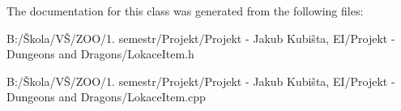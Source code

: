 The documentation for this class was generated from the following files\-:\begin{DoxyCompactItemize}
\item 
B\-:/Škola/\-VŠ/\-Z\-O\-O/1. semestr/\-Projekt/\-Projekt -\/ Jakub Kubišta, E\-I/\-Projekt -\/ Dungeons and Dragons/Lokace\-Item.\-h\item 
B\-:/Škola/\-VŠ/\-Z\-O\-O/1. semestr/\-Projekt/\-Projekt -\/ Jakub Kubišta, E\-I/\-Projekt -\/ Dungeons and Dragons/Lokace\-Item.\-cpp\end{DoxyCompactItemize}
